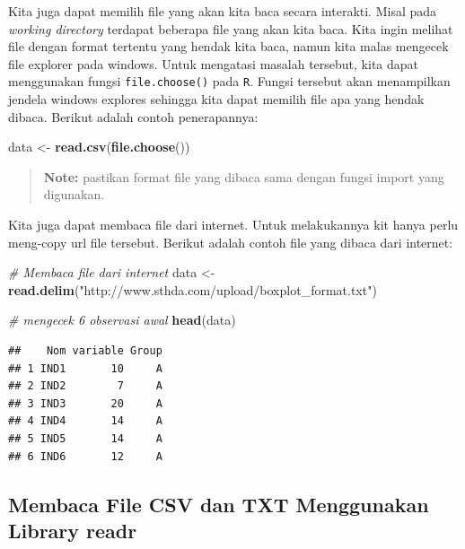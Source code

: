 \documentclass[]{book}
\newenvironment{Shaded}{\begin{snugshade}}{\end{snugshade}}
\newcommand{\KeywordTok}[1]{\textcolor[rgb]{0.13,0.29,0.53}{\textbf{#1}}}
\newcommand{\StringTok}[1]{\textcolor[rgb]{0.31,0.60,0.02}{#1}}
\newcommand{\CommentTok}[1]{\textcolor[rgb]{0.56,0.35,0.01}{\textit{#1}}}
\newcommand{\NormalTok}[1]{#1}
\begin{document}
Kita juga dapat memilih file yang akan kita baca secara interakti. Misal
pada \emph{working directory} terdapat beberapa file yang akan kita
baca. Kita ingin melihat file dengan format tertentu yang hendak kita
baca, namun kita malas mengecek file explorer pada windows. Untuk
mengatasi masalah tersebut, kita dapat menggunakan fungsi
\texttt{file.choose()} pada \texttt{R}. Fungsi tersebut akan menampilkan
jendela windows explores sehingga kita dapat memilih file apa yang
hendak dibaca. Berikut adalah contoh penerapannya:

\begin{Shaded}
\begin{Highlighting}[]
\NormalTok{data <-}\StringTok{ }\KeywordTok{read.csv}\NormalTok{(}\KeywordTok{file.choose}\NormalTok{())}
\end{Highlighting}
\end{Shaded}

\begin{quote}
\textbf{Note: } pastikan format file yang dibaca sama dengan fungsi
import yang digunakan.
\end{quote}

Kita juga dapat membaca file dari internet. Untuk melakukannya kit hanya
perlu meng-copy url file tersebut. Berikut adalah contoh file yang
dibaca dari internet:

\begin{Shaded}
\begin{Highlighting}[]
\CommentTok{# Membaca file dari internet}
\NormalTok{data <-}\StringTok{ }\KeywordTok{read.delim}\NormalTok{(}\StringTok{"http://www.sthda.com/upload/boxplot_format.txt"}\NormalTok{)}

\CommentTok{# mengecek 6 observasi awal}
\KeywordTok{head}\NormalTok{(data)}
\end{Highlighting}
\end{Shaded}

\begin{verbatim}
##    Nom variable Group
## 1 IND1       10     A
## 2 IND2        7     A
## 3 IND3       20     A
## 4 IND4       14     A
## 5 IND5       14     A
## 6 IND6       12     A
\end{verbatim}

\subsection{Membaca File CSV dan TXT Menggunakan Library
readr}\label{membaca-file-csv-dan-txt-menggunakan-library-readr}
\end{document}
